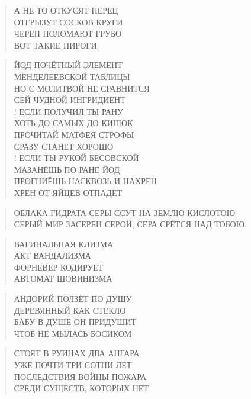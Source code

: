 \poemtitle{***}
\begin{verse}
А НЕ ТО ОТКУСЯТ ПЕРЕЦ\\
ОТГРЫЗУТ СОСКОВ КРУГИ\\
ЧЕРЕП ПОЛОМАЮТ ГРУБО\\
ВОТ ТАКИЕ ПИРОГИ
\end{verse}

\poemtitle{***}
\begin{verse}
ЙОД ПОЧЁТНЫЙ ЭЛЕМЕНТ\\
МЕНДЕЛЕЕВСКОЙ ТАБЛИЦЫ\\
НО С МОЛИТВОЙ НЕ СРАВНИТСЯ\\
СЕЙ ЧУДНОЙ ИНГРИДИЕНТ\\!
ЕСЛИ ПОЛУЧИЛ ТЫ РАНУ\\
ХОТЬ ДО САМЫХ ДО КИШОК\\
ПРОЧИТАЙ МАТФЕЯ СТРОФЫ\\
СРАЗУ СТАНЕТ ХОРОШО\\!
ЕСЛИ ТЫ РУКОЙ БЕСОВСКОЙ\\
МАЗАНЁШЬ ПО РАНЕ ЙОД\\
ПРОГНИЁШЬ НАСКВОЗЬ И НАХРЕН\\
ХРЕН ОТ ЯЙЦЕВ ОТПАДЁТ
\end{verse}

\poemtitle{***}
\begin{verse}
ОБЛАКА ГИДРАТА СЕРЫ ССУТ НА ЗЕМЛЮ КИСЛОТОЮ\\
СЕРЫЙ МИР ЗАСЕРЕН СЕРОЙ, СЕРА СРЁТСЯ НАД ТОБОЮ.
\end{verse}

\poemtitle{***}
\begin{verse}
ВАГИНАЛЬНАЯ КЛИЗМА\\
АКТ ВАНДАЛИЗМА\\
ФОРНЕВЕР КОДИРУЕТ\\
АВТОМАТ ШОВИНИЗМА
\end{verse}

\poemtitle{***}
\begin{verse}
АНДОРИЙ ПОЛЗЁТ ПО ДУШУ\\
ДЕРЕВЯННЫЙ КАК СТЕКЛО\\
БАБУ В ДУШЕ ОН ПРИДУШИТ\\
ЧТОБ НЕ МЫЛАСЬ БОСИКОМ
\end{verse}

\poemtitle{***}
\begin{verse}
СТОЯТ В РУИНАХ ДВА АНГАРА\\
УЖЕ ПОЧТИ ТРИ СОТНИ ЛЕТ\\
ПОСЛЕДСТВИЯ ВОЙНЫ ПОЖАРА\\
СРЕДИ СУЩЕСТВ, КОТОРЫХ НЕТ
\end{verse}

